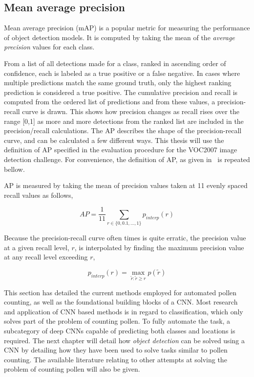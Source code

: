 \subsection{Mean average precision}
Mean average precision (mAP) is a popular metric for measuring the performance of object detection models.
It is computed by taking the mean of the \textit{average precision} values for each class.

From a list of all detections made for a class, ranked in ascending order of confidence, each is labeled as a true positive or a false negative.
In cases where multiple predictions match the same ground truth, only the highest ranking prediction is considered a true positive.
The cumulative precision and recall is computed from the ordered list of predictions and from these values, a precision-recall curve is drawn.
This shows how precision changes as recall rises over the range [0,1] as more and more detections from the ranked list are included in the precision/recall calculations.
The AP describes the shape of the precision-recall curve, and can be calculated a few different ways.
This thesis will use the definition of AP specified in the evaluation procedure for the VOC2007 image detection challenge.
For convenience, the definition of AP, as given in\ \textcite{everingham2010pascal} is repeated bellow.

AP is measured by taking the mean of precision values taken at 11 evenly spaced recall values as follows,

\begin{equation}\label{eq:average-precision}
  AP=\frac{1}{11} \sum_{r\in \{0,0.1,\dots,1\}}p_{interp}(r)
\end{equation}

Because the precision-recall curve often times is quite erratic, the precision value at a given recall level, \(r\), is interpolated by finding the maximum precision value at any recall level exceeding \(r\),

\begin{equation*}
  p_{interp}(r)=\max_{\tilde{r}:\tilde{r}\geq r}p(\tilde{r})
\end{equation*}

This section has detailed the current methods employed for automated pollen counting, as well as the foundational building blocks of a CNN\@.
Most research and application of CNN based methods is in regard to classification, which only solves part of the problem of counting pollen.
To fully automate the task, a subcategory of deep CNNs capable of predicting both classes and locations is required.
The next chapter will detail how \textit{object detection} can be solved using a CNN by detailing how they have been used to solve tasks similar to pollen counting.
The available literature relating to other attempts at solving the problem of counting pollen will also be given.

